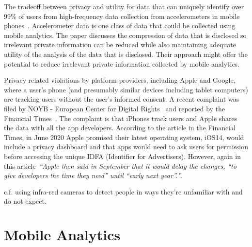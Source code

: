 
The tradeoff between privacy and utility for data that can uniquely identify over 99\% of users from high-frequency data collection from accelerometers in mobile phones~\citep{menasria2018_purpose_driven_privacy_preservation_accelerometers}. Accelerometer data is one class of data that could be collected using mobile analytics. The paper discusses the compression of data that is disclosed so irrelevant private information can be reduced while also maintaining adequate utility of the analysis of the data that is disclosed. Their approach might offer the potential to reduce irrelevant private information collected by mobile analytics.

Privacy related violations by platform providers, including Apple and Google, where a user's phone (and presumably similar devices including tablet computers) are tracking users without the user's informed consent. A recent complaint was filed by NOYB - European Center for Digital Rights~\citep{noyb2020_noyb_files_complaint_against_apples_tracking_code_idfa} and reported by the Financial Times~\citep{ft2020_apple_tracks_iphone_users_without_consent}. The complaint is that iPhones track users and Apple shares the data with all the app developers. According to the article in the Financial Times, in June 2020 Apple promised their latest operating system, iOS14, would include a privacy dashboard and that apps would need to ask users for permission before accessing the unique IDFA (Identifier for Advertisers). However, again in this article~\emph{``Apple then said in September that it would delay the changes, “to give developers the time they need” until “early next year”."}. 



c.f. using infra-red cameras to detect people in ways they're unfamiliar with and do not expect. 


\hypertarget{mobile.analytics}{}
\section{Mobile Analytics}~\label{rw-mobile-analytics-papers}
